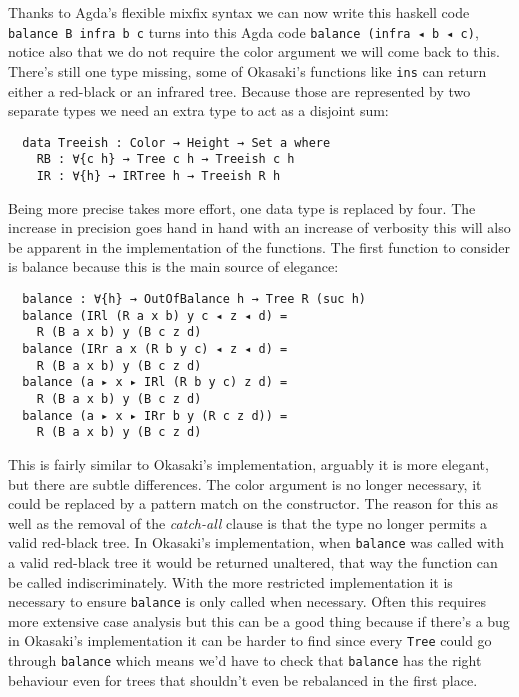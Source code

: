 \documentclass[journal, retainorgcmds]{IEEEtran}
\newcommand{\iagda}[1]{\texttt{#1}}
\newcommand{\ihask}[1]{\texttt{#1}}
\begin{document}
Thanks to Agda's flexible mixfix syntax we can now write this haskell code
\ihask{balance B infra b c} turns into this Agda code
\iagda{balance (infra ◂ b ◂ c)}, notice also that we do not require the color
argument we will come back to this.
There's still one type missing, some of Okasaki's functions like \ihask{ins}
can return either a red-black or an infrared tree.
Because those are represented by two separate types we need an extra type to
act as a disjoint sum:

\begin{verbatim}
  data Treeish : Color → Height → Set a where
    RB : ∀{c h} → Tree c h → Treeish c h
    IR : ∀{h} → IRTree h → Treeish R h
\end{verbatim}

Being more precise takes more effort, one data type is replaced by four.
The increase in precision goes hand in hand with an increase of verbosity this
will also be apparent in the implementation of the functions.
The first function to consider is balance because this is the main source of
elegance:

\begin{verbatim}
  balance : ∀{h} → OutOfBalance h → Tree R (suc h)
  balance (IRl (R a x b) y c ◂ z ◂ d) =
    R (B a x b) y (B c z d)
  balance (IRr a x (R b y c) ◂ z ◂ d) =
    R (B a x b) y (B c z d)
  balance (a ▸ x ▸ IRl (R b y c) z d) =
    R (B a x b) y (B c z d)
  balance (a ▸ x ▸ IRr b y (R c z d)) =
    R (B a x b) y (B c z d)
\end{verbatim}

This is fairly similar to Okasaki's implementation, arguably it is more
elegant, but there are subtle differences.
The color argument is no longer necessary, it could be replaced by a pattern
match on the constructor.
The reason for this as well as the removal of the \emph{catch-all} clause is
that the type no longer permits a valid red-black tree.
In Okasaki's implementation, when \ihask{balance} was called with a valid
red-black tree it would be returned unaltered, that way the function can be
called indiscriminately.
With the more restricted implementation it is necessary to ensure
\iagda{balance} is only called when necessary.
Often this requires more extensive case analysis but this can be a good thing
because if there's a bug in Okasaki's implementation it can be harder to find
since every \ihask{Tree} could go through \ihask{balance} which means we'd
have to check that \ihask{balance} has the right behaviour even for trees that
shouldn't even be rebalanced in the first place.
\end{document}
